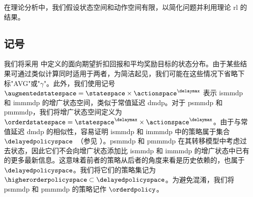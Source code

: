 在理论分析中，我们假设状态空间和动作空间有限，以简化问题并利用理论 \gls{rl} 的结果。


\subsection{记号}
我们将采用  中定义的面向期望折扣回报和平均奖励目标的状态分布。由于某些结果可通过类似计算同时适用于两者，为简洁起见，我们可能在这些情况下省略下标"AVG"或"$\gamma$"。此外，我们使用记号 $\augmentedstatespace=\statespace\times\actionspace^{\delaymax}$ 表示 \gls{ismmdp} 和 \gls{immmdp} 的增广状态空间，类似于常值延迟 \gls{dmdp}。对于 \gls{psmmdp} 和 \gls{pmmmdp}，我们将增广状态空间定义为 $\orderdstatespace=\statespace^{\delaymax}\times\actionspace^{\delaymax}$。由于与常值延迟 \gls{dmdp} 的相似性，容易证明 \gls{ismmdp} 和 \gls{immmdp} 中的策略属于集合 $\delayedpolicyspace$~（参见 ）。\gls{psmmdp} 和 \gls{pmmmdp} 在其转移模型中考虑过去状态，因此它们不会向增广状态添加比 \gls{ismmdp} 和 \gls{immmdp} 的增广状态中已有的更多最新信息。这意味着前者的策略从后者的角度来看是历史依赖的，也属于 $\delayedpolicyspace$。我们将它们的策略集记为 $\higherorderpolicyspace \subset \delayedpolicyspace$。为避免混淆，我们将 \gls{psmmdp} 和 \gls{pmmmdp} 的策略记作 $\orderdpolicy$。

